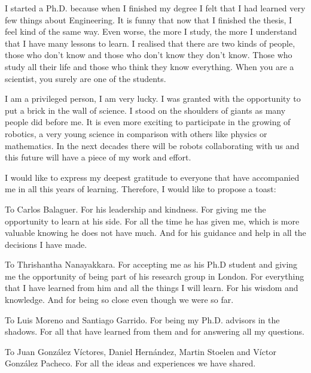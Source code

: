 I started a Ph.D. because when I finished my degree I felt that I had learned very few things about Engineering. It is funny that now that I  finished the thesis, I feel kind of the same way. Even worse, the more I study, the more I understand that I have many lessons to learn. I realised that there are two kinds of  people, those who don't know and those who don't know they don't know. Those who study all their life and those who think they know everything. When you are a scientist, you surely are  one of the students. 

I am a privileged person, I am very lucky. I was granted with the opportunity to put a brick in the wall of science. I stood on the shoulders of giants as many people did before me.  It is even more exciting to participate in the growing of robotics, a very young science in comparison with others like physics or mathematics. In the next decades there will be robots collaborating with us and this future will have a piece of my work and effort. 

I would like to express my deepest gratitude to everyone that have accompanied me in all this years of learning. Therefore, I would like to propose a toast:

To Carlos Balaguer. For his leadership and kindness. For giving me the opportunity to learn at his side. For all the time he has given me, which is more valuable knowing he does not have much. And for his guidance and help in all the  decisions I have made. 

To Thrishantha Nanayakkara. For accepting me as his Ph.D student and giving me the opportunity of being part of his research group in London. For everything that I have learned from him and all the things I  will learn. For his wisdom and knowledge. And for being so close even though we were so far. 

To Luis Moreno and Santiago Garrido. For being my  Ph.D. advisors in the shadows. For all that have learned from them and for answering all my questions. 

To Juan Gonz{\'a}lez V{\'i}ctores, Daniel Hern{\'a}ndez, Martin Stoelen and V{\'i}ctor Gonz{\'a}lez Pacheco. For all the ideas and experiences we have shared.

